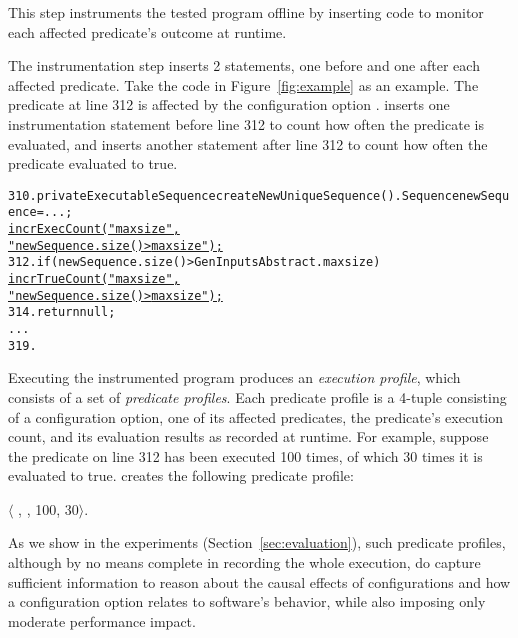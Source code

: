 This step instruments the tested program offline
by inserting code to monitor each affected predicate's outcome
at runtime.

The instrumentation step inserts 2 statements, one
before and one after each affected predicate. Take
the code in Figure~\ref{fig:example} as an example.
The predicate at line 312 is affected by
the configuration option . \ourtool inserts
one instrumentation statement before line 312 to
count how often the predicate is evaluated, and
inserts another statement after line 312 to count how often
the predicate evaluated to true.

\vspace{-1mm}

\begin{CodeOut}
\begin{alltt}
310. private ExecutableSequence createNewUniqueSequence() .   Sequence newSequence = ...; 
       \underline{incrExecCount("maxsize",}
                     \underline{"newSequence.size() > maxsize");}
312.   if (newSequence.size() > GenInputsAbstract.maxsize) \ttlcb
         \underline{incrTrueCount("maxsize",}
                       \underline{"newSequence.size() > maxsize");}
314.     return null;
      ...
319. \ttrcb
\end{alltt}
\end{CodeOut}

\vspace{-1mm}

Executing the instrumented program produces an \textit{execution profile}, which
consists of a set of \textit{predicate profiles}.
Each predicate profile is a 4-tuple consisting of a configuration option,
one of its affected predicates, the predicate's execution count, and its evaluation results as recorded at runtime. For example,
suppose the predicate on line 312 has been executed 100 times, of which
30 times it is evaluated to true. \ourtool creates the following predicate
profile:

\noindent $\langle$ , , 100, 30$\rangle$.

\vspace{1mm}


As we show in the experiments (Section~\ref{sec:evaluation}),
such predicate profiles, although by no means complete in
recording the whole execution, do capture
sufficient information to reason about the causal effects of configurations
and how a configuration option relates to software's behavior, while
also imposing only moderate performance impact.


